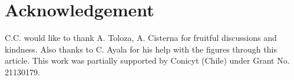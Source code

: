 \section*{Acknowledgement}

C.C. would like to thank A. Toloza, A. Cisterna for fruitful discussions and kindness. Also thanks to C. Ayala for his help with the figures through this article. This work was partially supported by Conicyt (Chile) under Grant No. 21130179.